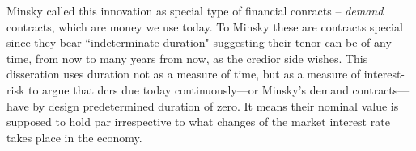 Minsky called this innovation as special type of financial conracts -- \textit{demand} contracts, which are money we use today. To Minsky these are contracts special since they bear ``indeterminate duration" suggesting their tenor can be of any time, from now to many years from now, as the credior side wishes. This disseration uses duration not as a measure of time, but as a measure of interest-risk to argue that \acp{dcr} due today continuously---or Minsky's demand contracts---have by design predetermined duration of zero. It means their nominal value is supposed to hold par irrespective to what changes of the market interest rate takes place in the economy.

\begin{figure}[!ht]
\vspace{.0in}
\captionsetup{width=1\linewidth,labelfont=bf}
    \centering
\end{figure}

